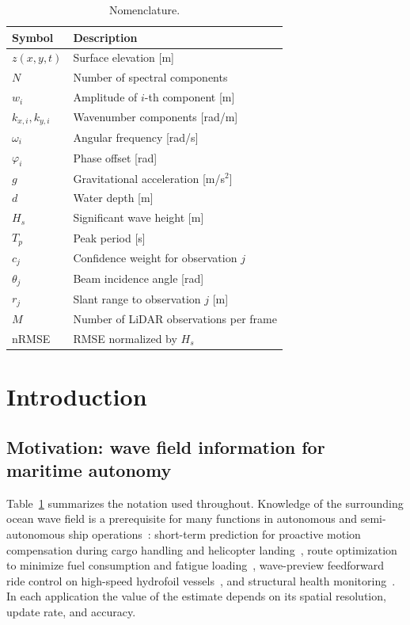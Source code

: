 \documentclass[review]{elsarticle}
\begin{document}
\begin{table}[h]
\centering
\caption{Nomenclature.}
\label{tab:nomenclature}
\begin{tabular}{ll}
\toprule
Symbol & Description \\
\midrule
$z(x,y,t)$ & Surface elevation [m] \\
$N$ & Number of spectral components \\
$w_i$ & Amplitude of $i$-th component [m] \\
$k_{x,i}, k_{y,i}$ & Wavenumber components [rad/m] \\
$\omega_i$ & Angular frequency [rad/s] \\
$\varphi_i$ & Phase offset [rad] \\
$g$ & Gravitational acceleration [m/s$^2$] \\
$d$ & Water depth [m] \\
$H_s$ & Significant wave height [m] \\
$T_p$ & Peak period [s] \\
$c_j$ & Confidence weight for observation $j$ \\
$\theta_j$ & Beam incidence angle [rad] \\
$r_j$ & Slant range to observation $j$ [m] \\
$M$ & Number of LiDAR observations per frame \\
nRMSE & RMSE normalized by $H_s$ \\
\bottomrule
\end{tabular}
\end{table}

\section{Introduction}
\label{sec:intro}

\subsection{Motivation: wave field information for maritime autonomy}

Table~\ref{tab:nomenclature} summarizes the notation used throughout.
Knowledge of the surrounding ocean wave field is a prerequisite for
many functions in autonomous and semi-autonomous ship
operations~\citep{faltinsen2005, holthuijsen2007}: short-term
prediction for proactive motion compensation during cargo handling
and helicopter landing~\citep{desmars2023jfm}, route optimization to
minimize fuel consumption and fatigue loading~\citep{vettor2016},
wave-preview feedforward ride control on high-speed hydrofoil
vessels~\citep{park2026hydrofoil}, and structural health
monitoring~\citep{DNV2010}.  In each application the value of the
estimate depends on its spatial resolution, update rate, and
accuracy.
\end{document}
